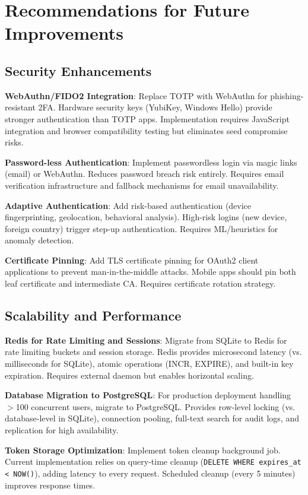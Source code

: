 \documentclass[12pt,a4paper]{article}
\begin{document}
\section{Recommendations for Future Improvements}

\subsection{Security Enhancements}

\textbf{WebAuthn/FIDO2 Integration}: Replace TOTP with WebAuthn for phishing-resistant 2FA. Hardware security keys (YubiKey, Windows Hello) provide stronger authentication than TOTP apps. Implementation requires JavaScript integration and browser compatibility testing but eliminates seed compromise risks.

\textbf{Password-less Authentication}: Implement passwordless login via magic links (email) or WebAuthn. Reduces password breach risk entirely. Requires email verification infrastructure and fallback mechanisms for email unavailability.

\textbf{Adaptive Authentication}: Add risk-based authentication (device fingerprinting, geolocation, behavioral analysis). High-risk logins (new device, foreign country) trigger step-up authentication. Requires ML/heuristics for anomaly detection.

\textbf{Certificate Pinning}: Add TLS certificate pinning for OAuth2 client applications to prevent man-in-the-middle attacks. Mobile apps should pin both leaf certificate and intermediate CA. Requires certificate rotation strategy.

\subsection{Scalability and Performance}

\textbf{Redis for Rate Limiting and Sessions}: Migrate from SQLite to Redis for rate limiting buckets and session storage. Redis provides microsecond latency (vs. milliseconds for SQLite), atomic operations (INCR, EXPIRE), and built-in key expiration. Requires external daemon but enables horizontal scaling.

\textbf{Database Migration to PostgreSQL}: For production deployment handling $>$100 concurrent users, migrate to PostgreSQL. Provides row-level locking (vs. database-level in SQLite), connection pooling, full-text search for audit logs, and replication for high availability.

\textbf{Token Storage Optimization}: Implement token cleanup background job. Current implementation relies on query-time cleanup (\texttt{DELETE WHERE expires\_at < NOW()}), adding latency to every request. Scheduled cleanup (every 5 minutes) improves response times.
\end{document}
